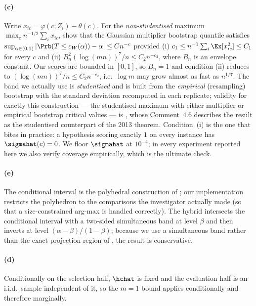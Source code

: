 \paragraph{(c)} Write $x_{ic}=\varphi(c;Z_i)-\theta(c)$. For the
\emph{non-studentised} maximum $\max_c n^{-1/2}\sum_i x_{ic}$,
\citet[Thm.~3.2 and Cor.~3.1]{chernozhukov2013gaussian} show that the Gaussian
multiplier bootstrap quantile satisfies
$\sup_{\alpha\in(0,1)}|\Prb(T\le c_W(\alpha))-\alpha|\le Cn^{-c}$ provided
(i) $c_1\le n^{-1}\sum_i\Ex[x_{ic}^2]\le C_1$ for every $c$ and
(ii) $B_n^2(\log(mn))^7/n\le C_2 n^{-c_2}$, where $B_n$ is an envelope constant.
Our scores are bounded in $[0,1]$, so $B_n=1$ and condition (ii) reduces to
$(\log(mn))^7/n\le C_2n^{-c_2}$, i.e.\ $\log m$ may grow almost as fast as
$n^{1/7}$. The band we actually use is \emph{studentised} and is built from the
\emph{empirical} (resampling) bootstrap with the standard deviation recomputed
in each replicate; validity for exactly this construction --- the studentised
maximum with either multiplier or empirical bootstrap critical values --- is
\citet[Thm.~4.3, ``Validity of one-step MB and EB methods'']{cck2019moment},
whose Comment~4.6 describes the result as the studentised counterpart of the
2013 theorem. Condition~(i) is the one that
bites in practice: a hypothesis scoring exactly $1$ on every instance has
$\sigmahat(c)=0$. We floor $\sigmahat$ at $10^{-4}$; in every experiment reported
here we also verify coverage empirically, which is the ultimate check.

\paragraph{(e)} The conditional interval is the polyhedral construction of
\citet{lee2016exact}; our implementation restricts the polyhedron to the
comparisons the investigator actually made (so that a size-constrained arg-max is
handled correctly). The hybrid intersects the conditional interval with a
two-sided simultaneous band at level $\beta$ and then inverts at level
$(\alpha-\beta)/(1-\beta)$; because we use a simultaneous band rather than the
exact projection region of \citet{andrews2024inference}, the result is
conservative.

\paragraph{(d)} Conditionally on the selection half, $\hchat$ is fixed and the
evaluation half is an i.i.d.\ sample independent of it, so the $m=1$ bound
applies conditionally and therefore marginally.

